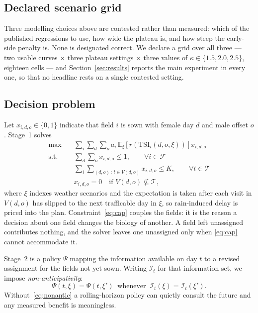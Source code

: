 \documentclass[10pt,twocolumn]{article}
\newcommand{\TSI}{\mathrm{TSI}}
\begin{document}
\subsection{Declared scenario grid}

Three modelling choices above are contested rather than measured: which of
the published regressions to use, how wide the plateau is, and how steep the
early-side penalty is. None is designated correct. We declare a grid over
all three --- two usable curves $\times$ three plateau settings $\times$
three values of $\kappa \in \{1.5, 2.0, 2.5\}$, eighteen cells --- and
Section~\ref{sec:results} reports the main experiment in every one, so that
no headline rests on a single contested setting.



\subsection{Decision problem}

Let $x_{i,d,o} \in \{0,1\}$ indicate that field $i$ is sown with female day
$d$ and male offset $o$. Stage~1 solves
\begin{align}
\max \quad & \sum_{i} \sum_{d} \sum_{o}
  a_i \, \mathbb{E}_{\xi}\!\left[ r(\TSI_i(d,o,\xi)) \right] x_{i,d,o}
  \label{eq:obj}\\
\text{s.t.}\quad
& \sum_{d}\sum_{o} x_{i,d,o} \le 1, \qquad \forall i \in \mathcal{F}
  \label{eq:once}\\
& \sum_{i}\sum_{(d,o)\,:\, t \in V(d,o)} x_{i,d,o} \le K,
  \qquad \forall t \in \mathcal{T}
  \label{eq:cap}\\
& x_{i,d,o} = 0 \quad \text{if } V(d,o) \not\subseteq \mathcal{T},
  \label{eq:window}
\end{align}
where $\xi$ indexes weather scenarios and the expectation is taken after
each visit in $V(d,o)$ has slipped to the next trafficable day in $\xi$, so
rain-induced delay is priced into the plan. Constraint~\eqref{eq:cap}
couples the fields: it is the reason a decision about one field changes the
biology of another. A field left unassigned contributes nothing, and the
solver leaves one unassigned only when \eqref{eq:cap} cannot accommodate it.

Stage~2 is a policy $\Psi$ mapping the information available on day $t$ to a
revised assignment for the fields not yet sown. Writing $\mathcal{I}_t$ for
that information set, we impose \emph{non-anticipativity}:
\begin{equation}
\Psi(t,\xi) = \Psi(t,\xi') \ \text{ whenever } \
\mathcal{I}_t(\xi) = \mathcal{I}_t(\xi').
\label{eq:nonantic}
\end{equation}
Without~\eqref{eq:nonantic} a rolling-horizon policy can quietly consult the
future and any measured benefit is meaningless.
\end{document}
